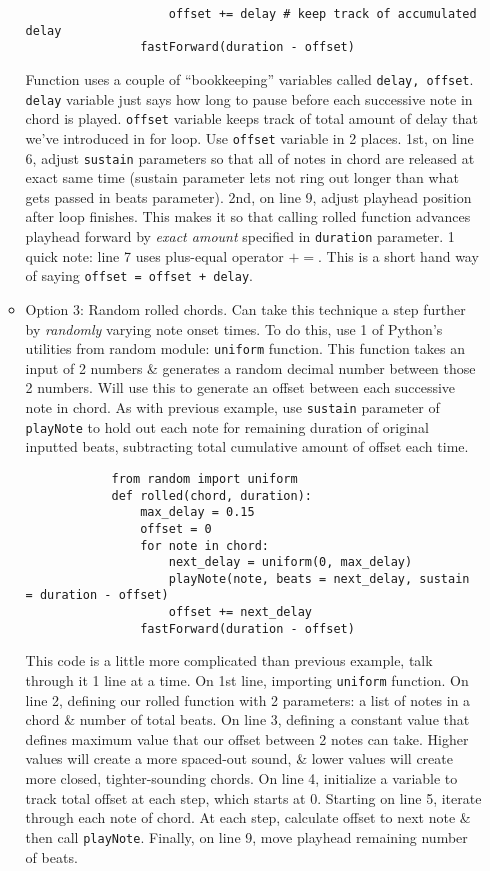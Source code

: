 \documentclass{article}
\begin{document}
\begin{itemize}
\begin{itemize}
\begin{verbatim}
			        offset += delay # keep track of accumulated delay
			    fastForward(duration - offset)
		\end{verbatim}
		Function uses a couple of ``bookkeeping'' variables called {\tt delay, offset}. {\tt delay} variable just says how long to pause before each successive note in chord is played. {\tt offset} variable keeps track of total amount of delay that we've introduced in for loop. Use {\tt offset} variable in 2 places. 1st, on line 6, adjust {\tt sustain} parameters so that all of notes in chord are released at exact same time (sustain parameter lets not ring out longer than what gets passed in beats parameter). 2nd, on line 9, adjust playhead position after loop finishes. This makes it so that calling rolled function advances playhead forward by {\it exact amount} specified in {\tt duration} parameter. 1 quick note: line 7 uses plus-equal operator $+=$. This is a short hand way of saying {\tt offset = offset + delay}.		
		\item {\sf Option 3: Random rolled chords.} Can take this technique a step further by {\it randomly} varying note onset times. To do this, use 1 of Python's utilities from random module: {\tt uniform} function. This function takes an input of 2 numbers \& generates a random decimal number between those 2 numbers. Will use this to generate an offset between each successive note in chord. As with previous example, use {\tt sustain} parameter of {\tt playNote} to hold out each note for remaining duration of original inputted beats, subtracting total cumulative amount of offset each time.
		\begin{verbatim}
			from random import uniform
			def rolled(chord, duration):
			    max_delay = 0.15
			    offset = 0
			    for note in chord:
		        	next_delay = uniform(0, max_delay)
			        playNote(note, beats = next_delay, sustain = duration - offset)
			        offset += next_delay
			    fastForward(duration - offset)
		\end{verbatim}
		This code is a little more complicated than previous example, talk through it 1 line at a time. On 1st line, importing {\tt uniform} function. On line 2, defining our rolled function with 2 parameters: a list of notes in a chord \& number of total beats. On line 3, defining a constant value that defines maximum value that our offset between 2 notes can take. Higher values will create a more spaced-out sound, \& lower values will create more closed, tighter-sounding chords. On line 4, initialize a variable to track total offset at each step, which starts at 0. Starting on line 5, iterate through each note of chord. At each step, calculate offset to next note \& then call {\tt playNote}. Finally, on line 9, move playhead remaining number of beats.
		

\end{itemize}
\end{itemize}
\end{document}
